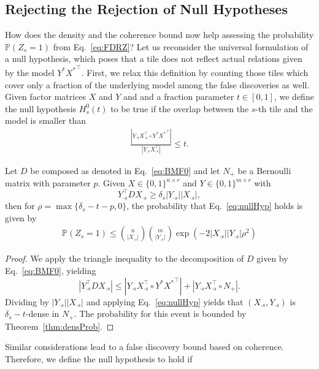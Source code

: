 \subsection{Rejecting the Rejection of Null Hypotheses}\label{sec:TP:rejectNullHyp}
How does the density and the coherence bound now help assessing the  probability $\mathbb{P}(Z_s=1)$ from Eq.~\eqref{eq:FDRZ}? Let us reconsider the universal formulation of a null hypothesis, which poses that a tile does not reflect actual relations given by the model $Y^*{X^*}^\top$. First, we relax this definition by counting those tiles which cover only a fraction of the underlying model among the false discoveries as well. Given factor matrices $X$ and $Y$ and and a fraction parameter $t\in[0,1]$, we define the null hypothesis $H_s^0(t)$ to be true if the overlap between the $s$-th tile and the model is smaller than 
\begin{align}\label{eq:nullHyp}
\frac{|Y_{\cdot s}X_{\cdot s}^\top\circ Y^*{X^*}^\top|}{|Y_{\cdot s}X_{\cdot s}^\top|}\leq t.
\end{align}
\begin{corollary}\label{thm:densZ}
Let $D$ be composed as denoted in Eq.~\eqref{eq:BMF0} and let $N_+$ be a Bernoulli matrix with parameter $p$. Given $X\in\{0,1\}^{n\times r}$ and $Y\in\{0,1\}^{m\times r}$ with 
\[Y_{\cdot s}^\top DX_{\cdot s}\geq \delta_s|Y_{\cdot s}||X_{\cdot s}|,\] 
then for $\rho = \max\{\delta_s-t-p,0\}$, the probability that  Eq.~\eqref{eq:nullHyp} holds is given by
\begin{align*}
\mathbb{P}(Z_s=1)\leq \binom{n}{|X_{\cdot s}|}\binom{m}{|Y_{\cdot s}|}\exp(-2|X_{\cdot s}||Y_{\cdot s}|\rho^2)
\end{align*}
\end{corollary}
\begin{proof}
We apply the triangle inequality to the decomposition of $D$ given by Eq.~\eqref{eq:BMF0}, yielding
\[|Y_{\cdot s}^\top DX_{\cdot s}|\leq |Y_{\cdot s}X_{\cdot s}^\top\circ Y^*{X^*}^\top|+|Y_{\cdot s}X_{\cdot s}^\top \circ N_+|.\]
Dividing by $|Y_{\cdot s}||X_{\cdot s}|$ and applying Eq.~\eqref{eq:nullHyp} yields that $(X_{\cdot s},Y_{\cdot s})$ is $\delta_s-t$-dense in $N_+$.
The probability for this event is bounded by Theorem~\ref{thm:densProb}.
\end{proof}
Similar considerations lead to a false discovery bound based on coherence. Therefore, we define the null hypothesis to hold if 
